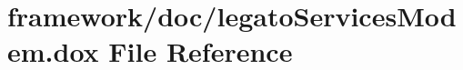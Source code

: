 \hypertarget{legato_services_modem_8dox}{}\section{framework/doc/legato\+Services\+Modem.dox File Reference}
\label{legato_services_modem_8dox}
